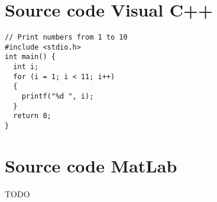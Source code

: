 

\section{Source code Visual C++}


\begin{lstlisting}[caption={[Demo] For loop to print numbers from 1 to 10}]
// Print numbers from 1 to 10
#include <stdio.h>
int main() {
  int i;
  for (i = 1; i < 11; i++)
  {
    printf("%d ", i);
  }
  return 0;
}
\end{lstlisting}


\section{Source code MatLab}

\Large{TODO}
